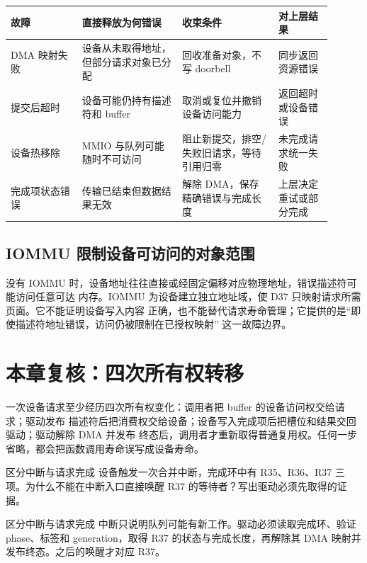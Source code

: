 \begin{longtable}{|L{0.20\linewidth}|L{0.28\linewidth}|L{0.27\linewidth}|L{0.15\linewidth}|}
\hline
故障 & 直接释放为何错误 & 收束条件 & 对上层结果 \\ \hline
DMA 映射失败 & 设备从未取得地址，但部分请求对象已分配 & 回收准备对象，不写 doorbell &
同步返回资源错误 \\\tablerowrule
提交后超时 & 设备可能仍持有描述符和 buffer & 取消或复位并撤销设备访问能力 &
返回超时或设备错误 \\\tablerowrule
设备热移除 & MMIO 与队列可能随时不可访问 & 阻止新提交，排空/失败旧请求，等待引用归零 &
未完成请求统一失败 \\\tablerowrule
完成项状态错误 & 传输已结束但数据结果无效 & 解除 DMA，保存精确错误与完成长度 &
上层决定重试或部分完成 \\ \hline
\end{longtable}

\subsection{IOMMU 限制设备可访问的对象范围}

没有 IOMMU 时，设备地址往往直接或经固定偏移对应物理地址，错误描述符可能访问任意可达
内存。IOMMU 为设备建立独立地址域，使 D37 只映射请求所需页面。它不能证明设备写入内容
正确，也不能替代请求寿命管理；它提供的是“即使描述符地址错误，访问仍被限制在已授权映射”
这一故障边界。

\section{本章复核：四次所有权转移}

一次设备请求至少经历四次所有权变化：调用者把 buffer 的设备访问权交给请求；驱动发布
描述符后把消费权交给设备；设备写入完成项后把槽位和结果交回驱动；驱动解除 DMA 并发布
终态后，调用者才重新取得普通复用权。任何一步省略，都会把函数调用寿命误写成设备寿命。

\begin{chapterexercise}{区分中断与请求完成}
设备触发一次合并中断，完成环中有 R35、R36、R37 三项。为什么不能在中断入口直接唤醒
R37 的等待者？写出驱动必须先取得的证据。
\end{chapterexercise}

\begin{chapteranswer}{区分中断与请求完成}
中断只说明队列可能有新工作。驱动必须读取完成环、验证 phase、标签和 generation，取得
R37 的状态与完成长度，再解除其 DMA 映射并发布终态。之后的唤醒才对应 R37。
\end{chapteranswer}

